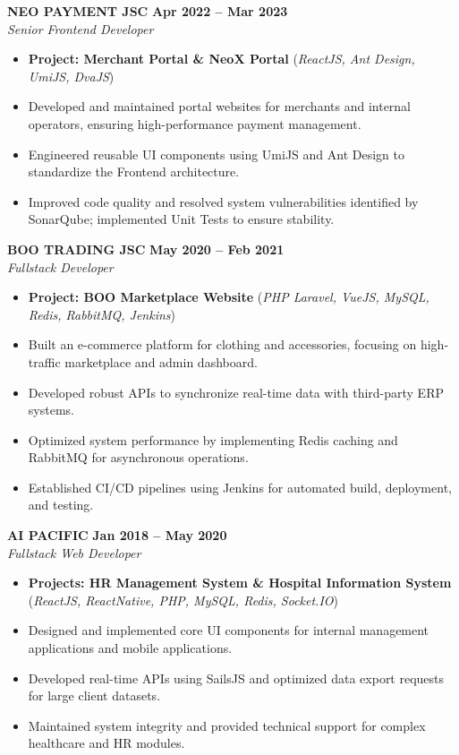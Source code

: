 \documentclass[11pt,a4paper]{article}
\begin{document}
\vspace{8pt}

\noindent \textbf{NEO PAYMENT JSC} \hfill \textbf{Apr 2022 -- Mar 2023} \\
\textit{Senior Frontend Developer}
\begin{itemize}
    \item \textbf{Project: Merchant Portal \& NeoX Portal} (\textit{ReactJS, Ant Design, UmiJS, DvaJS})
    \item Developed and maintained portal websites for merchants and internal operators, ensuring high-performance payment management.
    \item Engineered reusable UI components using UmiJS and Ant Design to standardize the Frontend architecture.
    \item Improved code quality and resolved system vulnerabilities identified by SonarQube; implemented Unit Tests to ensure stability.
\end{itemize}

\vspace{8pt}

\noindent \textbf{BOO TRADING JSC} \hfill \textbf{May 2020 -- Feb 2021} \\
\textit{Fullstack Developer}
\begin{itemize}
    \item \textbf{Project: BOO Marketplace Website} (\textit{PHP Laravel, VueJS, MySQL, Redis, RabbitMQ, Jenkins})
    \item Built an e-commerce platform for clothing and accessories, focusing on high-traffic marketplace and admin dashboard.
    \item Developed robust APIs to synchronize real-time data with third-party ERP systems.
    \item Optimized system performance by implementing Redis caching and RabbitMQ for asynchronous operations.
    \item Established CI/CD pipelines using Jenkins for automated build, deployment, and testing.
\end{itemize}

\vspace{8pt}

\noindent \textbf{AI PACIFIC} \hfill \textbf{Jan 2018 -- May 2020} \\
\textit{Fullstack Web Developer}
\begin{itemize}
    \item \textbf{Projects: HR Management System \& Hospital Information System} (\textit{ReactJS, ReactNative, PHP, MySQL, Redis, Socket.IO})
    \item Designed and implemented core UI components for internal management applications and mobile applications.
    \item Developed real-time APIs using SailsJS and optimized data export requests for large client datasets.
    \item Maintained system integrity and provided technical support for complex healthcare and HR modules.
\end{itemize}
\end{document}
